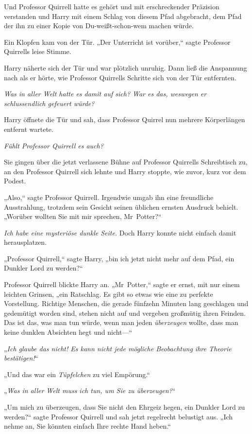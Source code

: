 {Und Professor Quirrell hatte es gehört und mit erschreckender Präzision verstanden und Harry mit einem Schlag von diesem Pfad abgebracht, dem Pfad der ihn zu einer Kopie von Du-weißt-schon-wem machen würde.

Ein Klopfen kam von der Tür. „Der Unterricht ist vorüber,“ sagte Professor Quirrells leise Stimme.

Harry näherte sich der Tür und war plötzlich unruhig. Dann ließ die Anspannung nach als er hörte, wie Professor Quirrells Schritte sich von der Tür entfernten.

\emph{Was in aller Welt hatte es damit auf sich? War es das, weswegen er schlussendlich gefeuert würde?}

Harry öffnete die Tür und sah, dass Professor Quirrel nun mehrere Körperlängen entfernt wartete.

\emph{Fühlt Professor Quirrell es auch?}

Sie gingen über die jetzt verlassene Bühne auf Professor Quirrells Schreibtisch zu, an den Professor Quirrell sich lehnte und Harry stoppte, wie zuvor, kurz vor dem Podest.

„Also,“ sagte Professor Quirrell. Irgendwie umgab ihn eine freundliche Ausstrahlung, trotzdem sein Gesicht seinen üblichen ernsten Ausdruck behielt. „Worüber wollten Sie mit mir sprechen, Mr~Potter?“

\emph{Ich habe eine mysteriöse dunkle Seite.} Doch Harry konnte nicht einfach damit herausplatzen.

„Professor Quirrell,“ sagte Harry, „bin ich jetzt nicht mehr auf dem Pfad, ein Dunkler Lord zu werden?“

Professor Quirrell blickte Harry an. „Mr~Potter,“ sagte er ernst, mit nur einem leichten Grinsen, „ein Ratschlag. Es gibt so etwas wie eine zu perfekte Vorstellung. Richtige Menschen, die gerade fünfzehn Minuten lang geschlagen und gedemütigt worden sind, stehen nicht auf und vergeben großmütig ihren Feinden. Das ist das, was man tun würde, wenn man jeden \emph{überzeugen} wollte, dass man keine dunklen Absichten hegt und nicht—“

„\emph{Ich glaube das nicht! Es kann nicht jede mögliche Beobachtung ihre Theorie bestätigen!}“

„Und das war ein \emph{Tüpfelchen} zu viel Empörung.“

„\emph{Was in aller Welt muss ich tun, um Sie zu überzeugen?}“

„Um mich zu überzeugen, dass Sie nicht den Ehrgeiz hegen, ein Dunkler Lord zu werden?“ sagte Professor Quirrell und sah jetzt regelrecht belustigt aus. „Ich nehme an, Sie könnten einfach Ihre rechte Hand heben.“

}
